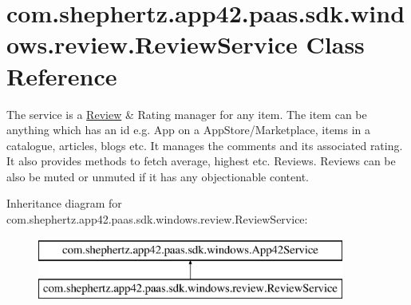 \hypertarget{classcom_1_1shephertz_1_1app42_1_1paas_1_1sdk_1_1windows_1_1review_1_1_review_service}{\section{com.\+shephertz.\+app42.\+paas.\+sdk.\+windows.\+review.\+Review\+Service Class Reference}
\label{classcom_1_1shephertz_1_1app42_1_1paas_1_1sdk_1_1windows_1_1review_1_1_review_service}
}


The service is a \hyperlink{classcom_1_1shephertz_1_1app42_1_1paas_1_1sdk_1_1windows_1_1review_1_1_review}{Review} \& Rating manager for any item. The item can be anything which has an id e.\+g. App on a App\+Store/\+Marketplace, items in a catalogue, articles, blogs etc. It manages the comments and its associated rating. It also provides methods to fetch average, highest etc. Reviews. Reviews can be also be muted or unmuted if it has any objectionable content.  


Inheritance diagram for com.\+shephertz.\+app42.\+paas.\+sdk.\+windows.\+review.\+Review\+Service\+:\begin{figure}[H]
\begin{center}
\leavevmode
\includegraphics[height=2.000000cm]{classcom_1_1shephertz_1_1app42_1_1paas_1_1sdk_1_1windows_1_1review_1_1_review_service}
\end{center}
\end{figure}
